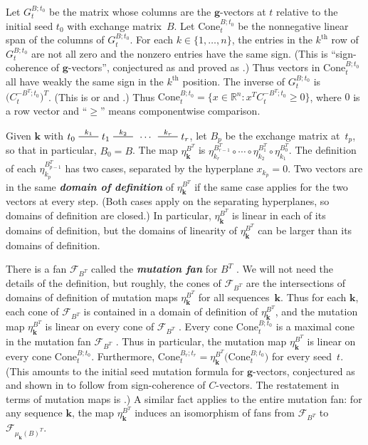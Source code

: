 \documentclass[10pt]{article}
\theoremstyle{definition}
\theoremstyle{remark}
\numberwithin{equation}{section}
\newcommand{\newword}[1]{\textbf{\emph{#1}}}
\newcommand{\reals}{\mathbb R}
\newcommand{\edge}{\,\,\rule[2.7pt]{20pt}{0.5pt}\,\,}
\newcommand{\set}[1]{{\lbrace #1 \rbrace}}
\newcommand{\sett}[1]{{\bigl\lbrace #1 \bigr\rbrace}}
\newcommand{\F}{{\mathcal F}}
\renewcommand{\th}{^\text{th}}
\newcommand{\0}{{\mathbf{0}}}
\newcommand{\Cone}{\mathrm{Cone}}
\newcommand{\g}{\mathbf{g}}
\newcommand{\kk}{{\boldsymbol{k}}}
\renewcommand{\th}{^\text{th}}
\begin{document}
Let $G_t^{B;t_0}$ be the matrix whose columns are the $\g$-vectors at $t$ relative to the initial seed $t_0$ with exchange matrix~$B$.
Let $\Cone^{B;t_0}_t$ be the nonnegative linear span of the columns of $G_t^{B;t_0}$.
For each $k\in\set{1,\ldots,n}$, the entries in the $k\th$ row of $G_t^{B;t_0}$ are not all zero and the nonzero entries have the same sign.
(This is ``sign-coherence of $\g$-vectors'', conjectured as \cite[Conjecture~6.13]{ca4} and proved as \cite[Theorem 5.11]{GHKK}.)
Thus vectors in $\Cone^{B;t_0}_t$ all have weakly the same sign in the $k\th$ position.
The inverse of $G_t^{B;t_0}$ is $\bigl(C_t^{-B^T;t_0}\bigr)^T$.
(This is \cite[Theorem~1.2]{NZ} or \cite[Theorem~1.1]{framework} and \cite[Theorem~3.30]{framework}.)
Thus $\Cone^{B;t_0}_t=\sett{x\in\reals^n:x^TC_t^{-B^T;t_0}\ge0}$, where $0$ is a row vector and ``$\ge$'' means componentwise comparison. 

Given $\kk$ with $t_0\overset{k_1}{\edge}t_1\overset{k_2}{\edge}\,\cdots\,\overset{k_r}{\edge}t_r$, let $B_p$ be the exchange matrix at~$t_p$, so that in particular, $B_0=B$.
The map $\eta_{\kk}^{B^T}$ is ${\eta_{k_r}^{B_{r-1}^T}\circ\cdots\circ\eta_{k_2}^{B_1^T}\circ\eta_{k_1}^{B_0^T}}$.
The definition of each $\eta_{k_p}^{B_{p-1}^T}$ has two cases, separated by the hyperplane $x_{k_p}=0$.
Two vectors are in the same \newword{domain of definition} of $\eta_\kk^{B^T}$ if the same case applies for the two vectors at every step.
(Both cases apply on the separating hyperplanes, so domains of definition are closed.)
In particular, $\eta_\kk^{B^T}$ is linear in each of its domains of definition, but the domains of linearity of $\eta_\kk^{B^T}$ can be larger than its domains of definition.

There is a fan $\F_{B^T}$ called the \newword{mutation fan} for $B^T$ \cite[Definition~5.12]{universal}.
We will not need the details of the definition, but roughly, the cones of $\F_{B^T}$ are the intersections of domains of definition of mutation maps $\eta_\kk^{B^T}$ for all sequences~$\kk$.
Thus for each $\kk$, each cone of $\F_{B^T}$ is contained in a domain of definition of $\eta_\kk^{B^T}$, and the mutation map $\eta_\kk^{B^T}$ is linear on every cone of $\F_{B^T}$ \cite[Proposition~5.3]{universal}.
Every cone $\Cone^{B;t_0}_t$ is a maximal cone in the mutation fan $\F_{B^T}$ \cite[Proposition~8.13]{universal}.
Thus in particular, the mutation map $\eta_\kk^{B^T}$ is linear on every cone $\Cone^{B;t_0}_t$.
Furthermore, $\Cone_t^{B_r;t_r}=\eta_\kk^{B^T}\bigl(\Cone_t^{B;t_0}\bigr)$ for every seed~$t$.
(This amounts to the initial seed mutation formula for $\g$-vectors, conjectured as \cite[Conjecture~7.12]{ca4} and shown in \cite[Proposition~4.2(v)]{NZ} to follow from sign-coherence of $C$-vectors.
The restatement in terms of mutation maps is \cite[Conjecture~8.11]{universal}.)
A similar fact applies to the entire mutation fan:
for any sequence $\kk$, the map $\eta_\kk^{B^T}$ induces an isomorphism of fans \cite[Proposition~7.3]{universal} from $\F_{B^T}$ to $\F_{\mu_\kk(B)^T}$.
\end{document}
